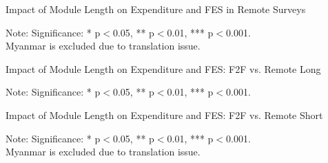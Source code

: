 \documentclass[11pt,harvard]{article}
\begin{document}
	\begin{table}[htbp]
		\centering
		\begin{adjustbox}{max width=\textwidth}
			\begin{threeparttable}
				\caption{Impact of Module Length on Expenditure and FES in Remote Surveys}
				\scriptsize
				 
				\label{tab:FES_RM_Form_Length_ECU_CAR}
				\begin{tablenotes}
					\item Note: Significance: * p$<$0.05, ** p$<$0.01, *** p$<$0.001. \\
					Myanmar is excluded due to translation issue.
				\end{tablenotes}
			\end{threeparttable}
		\end{adjustbox}
	\end{table}
	
	\begin{table}[htbp]
		\centering
		\begin{adjustbox}{max width=\textwidth}
			\begin{threeparttable}
				\caption{Impact of Module Length on Expenditure and FES: F2F vs. Remote Long}
				\scriptsize
				 
				\label{tab:FES_F2F_Long_All_Country}
				\begin{tablenotes}
					\item Note: Significance: * p$<$0.05, ** p$<$0.01, *** p$<$0.001. 
				\end{tablenotes}
			\end{threeparttable}
		\end{adjustbox}
	\end{table}
	
	\begin{table}[htbp]
		\centering
		\begin{adjustbox}{max width=\textwidth}
			\begin{threeparttable}
				\caption{Impact of Module Length on Expenditure and FES: F2F vs. Remote Short}
				\scriptsize
				 
				\label{tab:FES_F2F_Short_ECU_CAR}
				\begin{tablenotes}
					\item Note: Significance: * p$<$0.05, ** p$<$0.01, *** p$<$0.001. \\
					Myanmar is excluded due to translation issue.
				\end{tablenotes}
			\end{threeparttable}
		\end{adjustbox}
	\end{table}
	
\end{document}
